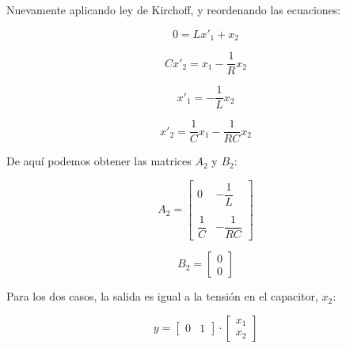 Nuevamente aplicando ley de Kirchoff, y reordenando las ecuaciones:

\vspace{-0.75cm}
\begin{equation}
    0 = Lx'_1 + x_2
\end{equation}

\vspace{-0.75cm}
\begin{equation}
    Cx'_2 = x_1 - \dfrac{1}{R} x_2 
\end{equation}

\vspace{-0.75cm}
\begin{equation}
    x'_1 = -\dfrac{1}{L} x_2
\end{equation}

\vspace{-0.75cm}
\begin{equation}
    x'_2 = \dfrac{1}{C} x_1 - \dfrac{1}{RC} x_2 
\end{equation}

De aquí podemos obtener las matrices $A_2$ y $B_2$:

\begin{equation}
    A_2 = \begin{bmatrix}
        0 & -\dfrac{1}{L}\\
        \\
        \dfrac{1}{C} & -\dfrac{1}{RC}
    \end{bmatrix}
\end{equation}

\vspace{-0.5cm}
\begin{equation}
    B_2 = \begin{bmatrix}
        0\\
        0
    \end{bmatrix}
\end{equation}

Para los dos casos, la salida es igual a la tensión en el capacitor, $x_2$:

\vspace{-0.5cm}
\begin{equation}
    y = \begin{bmatrix}
        0 & 1
    \end{bmatrix}
    \cdot
    \begin{bmatrix}
        x_1 \\
        x_2
    \end{bmatrix}
\end{equation}

